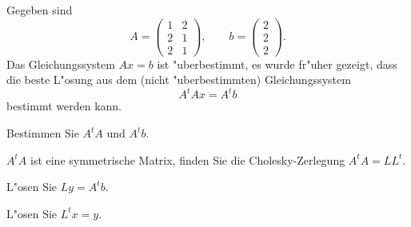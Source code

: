 Gegeben sind
\[
A=\begin{pmatrix}1&2\\2&1\\2&1\end{pmatrix},\qquad
b=\begin{pmatrix}2\\2\\2\end{pmatrix}.
\]
Das Gleichungssystem $Ax=b$ ist "uberbestimmt, es wurde fr"uher
gezeigt, dass die beste L"osung aus dem (nicht "uberbestimmten)
Gleichungssystem
\[
A^tAx=A^tb
\]
bestimmt werden kann.
\begin{teilaufgaben}
\item Bestimmen Sie $A^tA$ und $A^tb$.
\item $A^tA$ ist eine symmetrische Matrix, finden Sie die
Cholesky-Zerlegung $A^tA=LL^t$.
\item L"osen Sie $Ly=A^tb$.
\item L"osen Sie $L^tx=y$.
\end{teilaufgaben}

